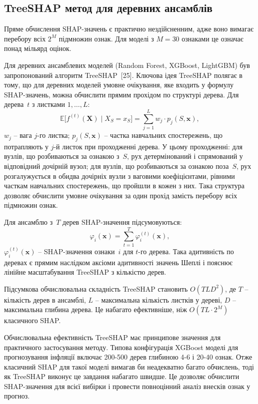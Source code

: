 \documentclass{bachelor_thesis}
\begin{document}
\subsection{TreeSHAP метод для деревних ансамблів}

Пряме обчислення SHAP-значень є практично нездійсненним, адже воно вимагає перебору всіх $2^M$ підмножин ознак. Для моделі з $M = 30$ ознаками це означає понад мільярд оцінок.

Для деревних ансамблевих моделей (Random Forest, XGBoost, LightGBM) був запропонований алгоритм TreeSHAP~[25]. Ключова ідея TreeSHAP полягає в тому, що для деревних моделей умовне очікування, яке входить у формулу SHAP-значень, можна обчислити прямим прохідом по структурі дерева. Для дерева~$t$ з листками $1, \ldots, L$:
\begin{equation*}
\mathbb{E}\bigl[f^{(t)}(\mathbf{X}) \mid X_S = x_S\bigr] = \sum_{j=1}^{L} w_j \cdot p_j(S, \mathbf{x}),
\end{equation*}
 $w_j$ -- вага $j$-го листка; $p_j(S, \mathbf{x})$ -- частка навчальних спостережень, що потрапляють у $j$-й листок при проходженні дерева. У цьому проходженні: для вузлів, що розбиваються за ознакою з~$S$, рух детермінований і спрямований у відповідний дочірній вузол; для вузлів, що розбиваються за ознакою поза~$S$, рух розгалужується в обидва дочірніх вузли з ваговими коефіцієнтами, рівними часткам навчальних спостережень, що пройшли в кожен з них. Така структура дозволяє обчислити умовне очікування за один прохід замість перебору всіх підмножин ознак.

Для ансамблю з~$T$ дерев SHAP-значення підсумовуються:
\begin{equation*}
\varphi_i(\mathbf{x}) = \sum_{t=1}^{T} \varphi_i^{(t)}(\mathbf{x}),
\end{equation*}
 $\varphi_i^{(t)}(\mathbf{x})$ -- SHAP-значення ознаки~$i$ для $t$-го дерева. Така адитивність по деревах є прямим наслідком аксіоми адитивності значень Шеплі і пояснює лінійне масштабування TreeSHAP з кількістю дерев.

Підсумкова обчислювальна складність TreeSHAP становить $O(TLD^2)$, де $T$ -- кількість дерев в ансамблі, $L$ -- максимальна кількість листків у дереві, $D$ -- максимальна глибина дерева. Це набагато ефективніше, ніж $O(TL \cdot 2^M)$ класичного SHAP.

Обчислювальна ефективність TreeSHAP має принципове значення для практичного застосування методу. Типова конфігурація XGBoost моделі для прогнозування інфляції включає 200-500 дерев глибиною 4-6 і 20-40 ознак. Отже класичний SHAP для такої моделі вимагав би неадекватно багато обчислень, тоді як TreeSHAP виконує це завдання набагато швидше. Це дозволяє обчислити SHAP-значення для всієї вибірки і провести повноцінний аналіз внесків ознак у прогноз.
\end{document}
